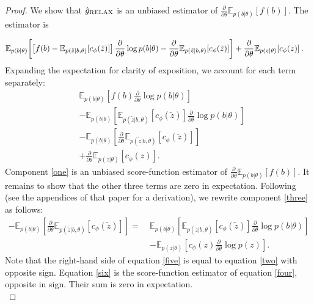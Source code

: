 \documentclass{article}
\newcommand{\E}{\mathbb{E}}
\newcommand{\PT}{\frac{\partial}{\partial \theta}}
\begin{document}
\begin{proof}
	We show that $\hat g_\textnormal{RELAX}$ is an unbiased estimator of $\frac{\partial}{\partial \theta} \mathbb{E}_{p(b \vert \theta)} \left[ f(b) \right]$. The estimator is
	
	\begin{align*}
	\E_{p(b|\theta)} \! \left[\left[ f(b) - \E_{p(\tilde{z}|b, \theta)} \! \left[c_\phi(\tilde{z}) \right] \right]\PT \log p(b|\theta)  - \PT \E_{p(\tilde{z}|b, \theta)} \! \left[c_\phi(\tilde{z}) \right] \right] + \PT\E_{p(z|\theta)} \! \left[ c_\phi(z) \right]. \span & \nonumber \\
	\end{align*}
	Expanding the expectation for clarity of exposition, we account for each term separately:
	\begin{align}
	& \E_{p(b|\theta)} \! \left[ f(b) \PT \log p(b|\theta)  \right] \label{one}\\ 
	& - \E_{p(b|\theta)} \left[ \E_{p(\tilde{z}|b, \theta)} \! \left[c_\phi (\tilde{z}) \right] \PT \log p(b|\theta)  \right] \label{two}\\
	& - \E_{p(b|\theta)}  \left[ \PT \E_{p(\tilde{z}|b, \theta)} \! \left[c_\phi(\tilde{z}) \right] \right] \label{three}\\
	& + \PT\E_{p(z|\theta)} \! \left[ c_\phi(z) \right]. \label{four}
	\end{align}
	Component \eqref{one} is an unbiased score-function estimator of $\frac{\partial}{\partial \theta} \mathbb{E}_{p(b \vert \theta)} \left[ f(b) \right]$. It remains to show that the other three terms are zero in expectation. Following \cite{tucker2017rebar} (see the appendices of that paper for a derivation), we rewrite component \eqref{three} as follows:
	\begin{align}
	-\mathbb{E}_{p(b \vert \theta)} \left[ \frac{\partial}{\partial \theta} \mathbb{E}_{p(\tilde{z} \vert b, \theta)} \left[ c_\phi (\tilde{z}) \right] \right] =~&\mathbb{E}_{p(b \vert \theta)} \left[ \mathbb{E}_{p(\tilde{z} \vert b, \theta)} \left[ c_\phi(\tilde{z}) \right] \frac{\partial}{\partial \theta} \log p(b \vert \theta) \right] \label{five} \\ & -  \mathbb{E}_{p(z \vert \theta)} \left[ c_\phi(z) \frac{\partial}{\partial \theta} \log p(z) \right] . \label{six}
	\end{align}
	Note that the right-hand side of equation \eqref{five} is equal to equation \eqref{two} with opposite sign. Equation \eqref{six} is the score-function estimator of equation \eqref{four}, opposite in sign. Their sum is zero in expectation.
	\\
\end{proof}
\end{document}
